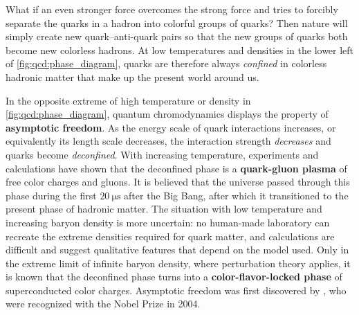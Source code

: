 What if an even stronger force overcomes the strong force and tries to forcibly separate the quarks in a hadron into colorful groups of quarks?
Then nature will simply create new quark--anti-quark pairs so that the new groups of quarks both become new colorless hadrons.
At low temperatures and densities in the lower left of \cref{fig:qcd:phase_diagram}, quarks are therefore always \emph{confined} in colorless hadronic matter that make up the present world around us.

In the opposite extreme of high temperature or density in \cref{fig:qcd:phase_diagram}, quantum chromodynamics displays the property of \textbf{asymptotic freedom}.
As the energy scale of quark interactions increases, or equivalently its length scale decreases, the interaction strength \emph{decreases} and quarks become \emph{deconfined}.
With increasing temperature, experiments and calculations have shown that the deconfined phase is a \textbf{quark-gluon plasma} of free color charges and gluons.
It is believed that the universe passed through this phase during the first $\SI{20}{\micro\second}$ after the Big Bang, after which it transitioned to the present phase of hadronic matter.
The situation with low temperature and increasing baryon density is more uncertain:
no human-made laboratory can recreate the extreme densities required for quark matter,
and calculations are difficult and suggest qualitative features that depend on the model used.
Only in the extreme limit of infinite baryon density, where perturbation theory applies,
it is known that the deconfined phase turns into a \textbf{color-flavor-locked phase} of superconducted  color charges.
Asymptotic freedom was first discovered by \cite{ref:asymptotic_freedom_gross_wilczek,ref:asymptotic_freedom_politzer}, who were recognized with the Nobel Prize in 2004.


